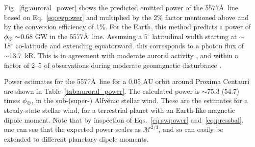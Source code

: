 \documentclass{emulateapj}
\begin{document}
Fig.~\ref{fig:auroral_power} shows the predicted emitted power of the 5577\AA\ line based on Eq.~\ref{eq:swpower} and multiplied by the 2\% factor mentioned above and by the conversion efficiency of 1\%. For the Earth, this method predicts a power of $\phi_{\oplus}\sim$0.68 GW in the 5577\AA\ line. Assuming a 5$^{\circ}$ latitudinal width starting at $\sim$18$^{\circ}$ co-latitude and extending equatorward, this corresponds to a photon flux of $\sim$13.7~kR. This is in agreement with moderate auroral activity \citep[IBC II\footnote{IBC = International Brightness Coefficients, a standardized scale for quantifying auroral intensities \citep[see, e.g.,][]{Hunten1955}.}, 10 kR 5577\AA\ emission; see Table II.1 in][]{Chamberlain1961}, and within a factor of 2--5 of observations during moderate geomagnetic disturbance \citep[2.5--6 kR 5577 \AA\ emission, e.g.][]{Steele1990}.

Power estimates for the 5577\AA\ line for a 0.05 AU orbit around Proxima Centauri are shown in Table~\ref{tab:auroral_power}. The calculated power is $\sim$75.3 (54.7) times $\phi_{\oplus}$, in the sub-\mbox{(super-)} Alfv\'{e}nic stellar wind. These are the estimates for a steady-state stellar wind, for a terrestrial planet with an Earth-like magnetic dipole moment. Note that by inspection of Eqs.~\ref{eq:swpower} and~\ref{eq:pressbal}, one can see that the expected power scales as $\mathcal{M}^{2/3}$, and so can easily be extended to different planetary dipole moments.
\end{document}
